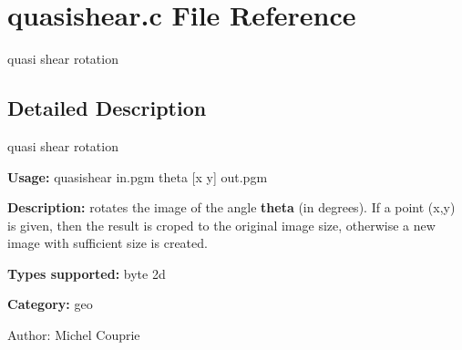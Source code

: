 \section{quasishear.c File Reference}
\label{quasishear_8c}
quasi shear rotation 



\subsection{Detailed Description}
quasi shear rotation 

{\bf Usage:} quasishear in.pgm theta [x y] out.pgm

{\bf Description:} rotates the image of the angle {\bf theta} (in degrees). If a point (x,y) is given, then the result is croped to the original image size, otherwise a new image with sufficient size is created.

{\bf Types supported:} byte 2d

{\bf Category:} geo

\begin{Desc}
\item[Author:]Michel Couprie \end{Desc}
